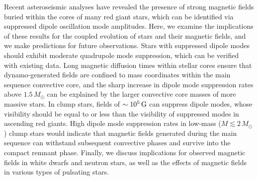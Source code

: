 Recent asteroseismic analyses have revealed the presence of strong magnetic fields buried within the cores of many red giant stars, which can be identified via suppressed dipole oscillation mode amplitudes. Here, we examine the implications of these results for the coupled evolution of stars and their magnetic fields, and we make predictions for future observations. Stars with suppressed dipole modes should exhibit moderate quadrupole mode suppression, which can be verified with existing data. Long magnetic diffusion times within stellar cores ensure that dynamo-generated fields are confined to mass coordinates within the main sequence convective core, and the sharp increase in dipole mode suppression rates above $1.5 \, M_\odot$ can be explained by the larger convective core masses of more massive stars.
In clump stars, fields of $\sim 10^5 \, {\rm G}$ can suppress dipole modes, whose visibility should be equal to or less than the visibility of suppressed modes in ascending red giants. High dipole mode suppression rates in low-mass ($M \lesssim 2 \, M_\odot$) clump stars would indicate that magnetic fields generated during the main sequence can withstand subsequent convective phases and survive into the compact remnant phase. Finally, we discuss implications for observed magnetic fields in white dwarfs and neutron stars, as well as the effects of magnetic fields in various types of pulsating stars.
  
  
  
  
  
  
  